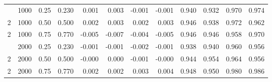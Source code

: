\begin{table}[t]
\begin{tabular}{rrr r rrrr rrrr}
\addlinespace
2 & 1000 & 0.25 & 0.230 & 0.001 & 0.003 & -0.001 & -0.001 & 0.940 & 0.932 & 0.970 & 0.974 \\
2 & 1000 & 0.50 & 0.500 & 0.002 & 0.003 & 0.002 & 0.003 & 0.946 & 0.938 & 0.972 & 0.962 \\
2 & 1000 & 0.75 & 0.770 & -0.005 & -0.007 & -0.004 & -0.005 & 0.946 & 0.946 & 0.958 & 0.970 \\
\addlinespace
2 & 2000 & 0.25 & 0.230 & -0.001 & -0.001 & -0.002 & -0.001 & 0.938 & 0.940 & 0.960 & 0.956 \\
2 & 2000 & 0.50 & 0.500 & -0.000 & 0.000 & -0.001 & -0.000 & 0.944 & 0.954 & 0.964 & 0.956 \\
2 & 2000 & 0.75 & 0.770 & 0.002 & 0.002 & 0.003 & 0.004 & 0.948 & 0.950 & 0.980 & 0.986 \\
\bottomrule\end{tabular}\end{table}

